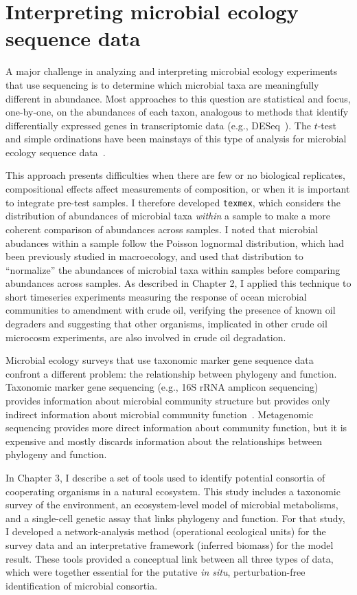 \section{Interpreting microbial ecology sequence data}
A major challenge in analyzing and interpreting microbial ecology experiments
that use sequencing is to determine which microbial taxa are meaningfully
different in abundance. Most approaches to this question are statistical and
focus, one-by-one, on the abundances of each taxon, analogous to methods that
identify differentially expressed genes in transcriptomic data (e.g.,
DESeq~\cite{anders_high_2010}). The $t$-test and simple ordinations have been
mainstays of this type of analysis for microbial ecology sequence
data~\cite{segata_metagenomic_2011}.

This approach presents difficulties when there are few or no biological
replicates, compositional effects affect measurements of composition, or when
it is important to integrate pre-test samples. I therefore developed
\texttt{texmex}, which considers the distribution of abundances of microbial taxa
\emph{within} a sample to make a more coherent comparison of abundances across
samples. I noted that microbial abudances within a sample follow the Poisson
lognormal distribution, which had been previously studied in macroecology, and
used that distribution to ``normalize'' the abundances of microbial taxa
within samples before comparing abundances across samples. As described in
Chapter 2, I applied this technique to short timeseries experiments measuring
the response of ocean microbial communities to amendment with crude oil,
verifying the presence of known oil degraders and suggesting that other
organisms, implicated in other crude oil microcosm experiments, are also
involved in crude oil degradation.

Microbial ecology surveys that use taxonomic marker gene sequence data
confront a different problem: the relationship between phylogeny and
function. Taxonomic marker gene sequencing (e.g., 16S rRNA amplicon sequencing)
provides information about microbial community structure but provides
only indirect information about microbial community function~\cite{langille_predictive_2013}. Metagenomic
sequencing provides more direct information about community function,
but it is expensive and mostly discards information about the relationships
between phylogeny and function.

In Chapter 3, I describe a set of tools used to identify potential consortia
of cooperating organisms in a natural ecosystem. This study includes a
taxonomic survey of the environment, an ecosystem-level model of microbial
metabolisms, and a single-cell genetic assay that links phylogeny and
function. For that study, I developed a network-analysis method (operational
ecological units) for the survey data and an interpretative framework
(inferred biomass) for the model result. These tools provided a conceptual
link between all three types of data, which were together essential for
the putative \textit{in situ}, perturbation-free identification of
microbial consortia.

